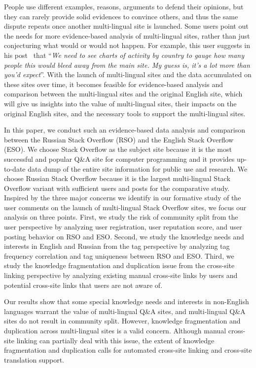 People use different examples, reasons, arguments to defend their opinions, but they can rarely provide solid evidences to convince others, and thus the same dispute repeats once another multi-lingual site is launched.
Some users point out the needs for more evidence-based analysis of multi-lingual sites, rather than just conjecturing what would or would not happen.
For example, this user suggests in his post~\cite{web:SOdiscussion1} that ``\textit{We need to see charts of activity by country to gauge how many people this would bleed away from the main site. My guess is, it's a lot more than you'd expect}''.
With the launch of multi-lingual sites and the data accumulated on these sites over time, it becomes feasible for evidence-based analysis and comparison between the multi-lingual sites and the original English site, which will give us insights into the value of multi-lingual sites, their impacts on the original English sites, and the necessary tools to support the multi-lingual sites.

In this paper, we conduct such an evidence-based data analysis and comparison between the Russian Stack Overflow (RSO) and the English Stack Overflow (ESO).
We choose Stack Overflow as the subject site because it is the most successful and popular Q\&A site for computer programming and it provides up-to-date data dump of the entire site information for public use and research.
We choose Russian Stack Overflow because it is the largest multi-lingual Stack Overflow variant with sufficient users and posts for the comparative study.
Inspired by the three major concerns we identify in our formative study of the user comments on the launch of multi-lingual Stack Overflow sites, we focus our analysis on three points.
First, we study the risk of community split from the user perspective by analyzing user registration, user reputation score, and user posting behavior on RSO and ESO.
Second, we study the knowledge needs and interests in English and Russian from the tag perspective by analyzing tag frequency correlation and tag uniqueness between RSO and ESO.
Third, we study the knowledge fragmentation and duplication issue from the cross-site linking perspective by analyzing existing manual cross-site links by users and potential cross-site links that users are not aware of.

Our results show that some special knowledge needs and interests in non-English languages warrant the value of multi-lingual Q\&A sites, and multi-lingual Q\&A sites do not result in community split.
However, knowledge fragmentation and duplication across multi-lingual sites is a valid concern.
Although manual cross-site linking can partially deal with this issue, the extent of knowledge fragmentation and duplication calls for automated cross-site linking and cross-site translation support.

